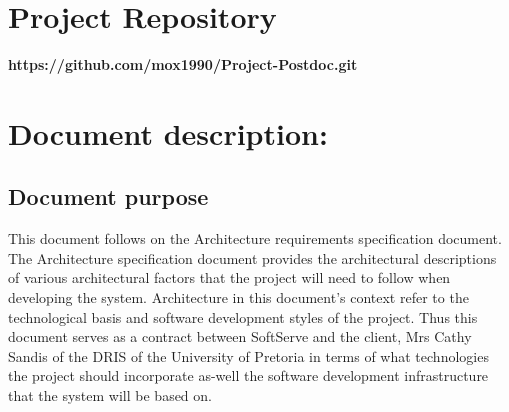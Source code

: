 \documentclass[12pt]{article}
\newcommand{\repo}{https://github.com/mox1990/Project-Postdoc.git}
\begin{document}
\listoffigures
\newpage
\section{Project Repository}
\textbf{\repo}
\newpage

\section{Document description:}%

\subsection{Document purpose}
\vspace{0.2in}

This document follows on the Architecture requirements specification document. The Architecture specification document provides the architectural descriptions of various architectural factors that the project will need to follow when developing the system.  Architecture in this document's context refer to the technological basis and software development styles of the project. Thus this document serves as a contract between SoftServe and the client, Mrs Cathy Sandis of the DRIS of the University of Pretoria in terms of what technologies the project should incorporate as-well the software development infrastructure that the system will be based on.
\vspace{0.2in}
\end{document}
